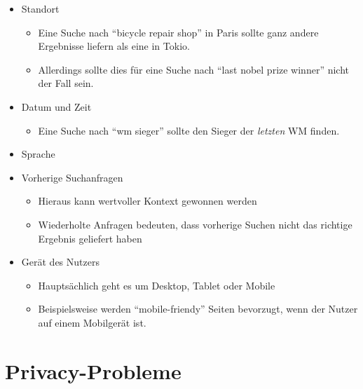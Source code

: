 \documentclass{article}
\begin{document}
\begin{itemize}
    \item Standort
    \begin{itemize}
        \item Eine Suche nach ``bicycle repair shop'' in Paris sollte ganz andere Ergebnisse liefern als eine in Tokio. 
        \item Allerdings sollte dies für eine Suche nach ``last nobel prize winner'' nicht der Fall sein.
    \end{itemize}
    \item Datum und Zeit
    \begin{itemize}
        \item Eine Suche nach ``wm sieger'' sollte den Sieger der \textit{letzten} WM finden.
    \end{itemize}
    \item Sprache
    \item Vorherige Suchanfragen
    \begin{itemize}
        \item Hieraus kann wertvoller Kontext gewonnen werden
        \item Wiederholte Anfragen bedeuten, dass vorherige Suchen nicht das richtige Ergebnis geliefert haben
    \end{itemize}
    \item Gerät des Nutzers
    \begin{itemize}
        \item Hauptsächlich geht es um Desktop, Tablet oder Mobile
        \item Beispielsweise werden ``mobile-friendy'' Seiten bevorzugt, wenn der Nutzer auf einem Mobilgerät ist.
    \end{itemize}
\end{itemize}

\section{Privacy-Probleme}
\end{document}
